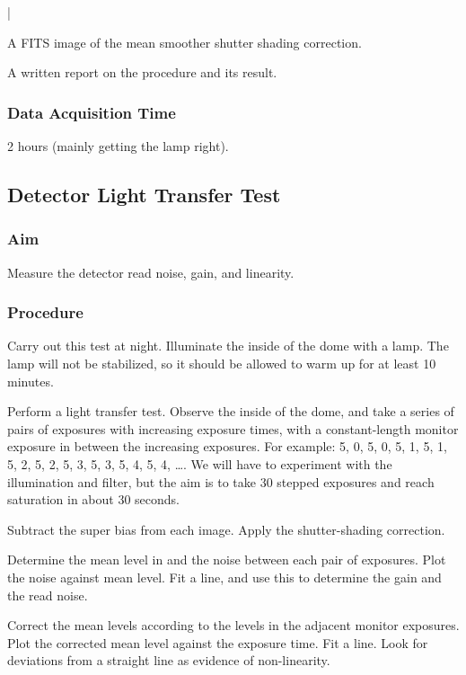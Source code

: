 |\documentclass{article}
\begin{document}
A FITS image of the mean smoother shutter shading correction.

A written report on the procedure and its result.

\subsubsection{Data Acquisition Time}

2 hours (mainly getting the lamp right).


\subsection{Detector Light Transfer Test}

\subsubsection{Aim}

Measure the detector read noise, gain, and linearity.

\subsubsection{Procedure}

Carry out this test at night. Illuminate the inside of the dome with a lamp. The lamp will not be stabilized, so it should be allowed to warm up for at least 10 minutes.

Perform a light transfer test. Observe the inside of the dome, and take a series of pairs of exposures with increasing exposure times, with a constant-length monitor exposure in between the increasing exposures. For example: 5, 0, 5, 0, 5, 1, 5, 1, 5, 2, 5, 2, 5, 3, 5, 3, 5, 4, 5, 4, \ldots. We will have to experiment with the illumination and filter, but the aim is to take 30 stepped exposures and reach saturation in about 30 seconds.

Subtract the super bias from each image. Apply the shutter-shading correction.

Determine the mean level in and the noise between each pair of exposures. Plot the noise against mean level. Fit a line, and use this to determine the gain and the read noise.

Correct the mean levels according to the levels in the adjacent monitor exposures. Plot the corrected mean level against the exposure time. Fit a line. Look for deviations from a straight line as evidence of non-linearity.
\end{document}
